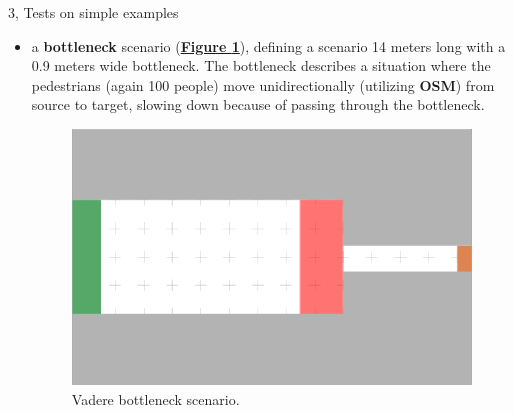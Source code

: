 \documentclass[10pt,a4paper]{article}
\begin{document}
\begin{task}{3, Tests on simple examples}
\begin{itemize}
    \item a \textbf{bottleneck} scenario (\textbf{\hyperref[fig:vadere-bottleneck]{Figure \ref{fig:vadere-bottleneck}}}), defining a scenario 14 meters long with a 0.9 meters wide bottleneck. The bottleneck describes a situation where the pedestrians (again 100 people) move unidirectionally (utilizing \textbf{OSM}) from source to target, slowing down because of passing through the bottleneck.
    
    \begin{figure}[h]
    \centering
    \includegraphics[scale=0.8]{images/vadere-bottleneck.png}
    \caption{Vadere bottleneck scenario.}
    \label{fig:vadere-bottleneck}
    \end{figure}
\end{itemize}


\end{task}
\end{document}
